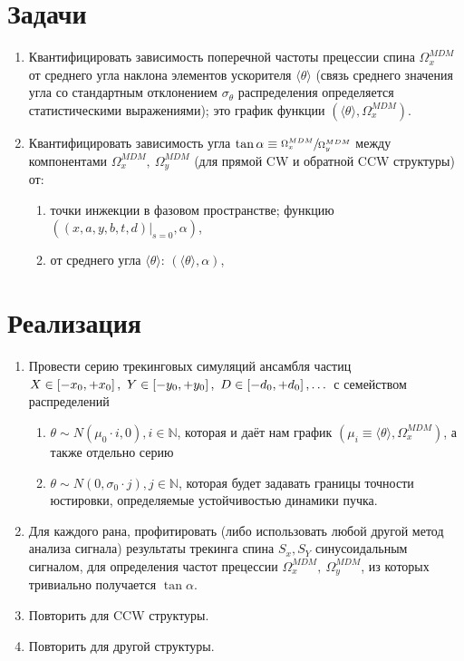 \documentclass{article}
\newcommand{\N}{\mathbb{N}}
\newcommand{\Wmdm}[1]{\Omega_{#1}^{MDM}}
\newcommand{\avg}[1]{\langle #1 \rangle}
\begin{document}
\section{Задачи}
\begin{enumerate}
\item Квантифицировать зависимость поперечной частоты прецессии спина $\Wmdm{x}$ от среднего угла наклона элементов ускорителя $\avg{\theta}$ (связь среднего значения угла со стандартным отклонением $\sigma_\theta$ распределения определяется статистическими выражениями); это график функции $(\avg{\theta}, \Wmdm{x})$.
\item Квантифицировать зависимость угла $\tan\alpha \equiv \sfrac{\Wmdm{x}}{\Wmdm{y}}$ между компонентами $\Wmdm{x},~\Wmdm{y}$ (для прямой CW и обратной CCW структуры) от:
  \begin{enumerate}
  \item точки инжекции в фазовом пространстве; функцию $((x,a,y,b,t,d)\vert_{s=0}, \alpha)$,
  \item от среднего угла $\avg{\theta}$: $(\avg{\theta}, \alpha)$,
  \end{enumerate}
\end{enumerate}

\section{Реализация}
\begin{enumerate}
\item Провести серию трекинговых симуляций ансамбля частиц $X\in \bkt*{-x_0, +x_0}, ~Y\in\bkt*{-y_0, +y_0}, ~D\in\bkt*{-d_0, +d_0}, \dots$ с семейством распределений
  \begin{enumerate}
  \item $\theta \sim N(\mu_0\cdot i, 0), i\in \N$, которая и даёт нам график $(\mu_i\equiv\avg{\theta}, \Wmdm{x})$, а также отдельно серию
  \item $\theta \sim N(0, \sigma_0\cdot j), j \in \N$, которая будет задавать границы точности юстировки, определяемые устойчивостью динамики пучка.
    \end{enumerate}
\item Для каждого рана, профитировать (либо использовать любой другой метод анализа сигнала) результаты трекинга спина $S_x, S_Y$ синусоидальным сигналом, для определения частот прецессии $\Wmdm{x}, ~\Wmdm{y}$, из которых тривиально получается $\tan\alpha$.
\item Повторить для CCW структуры.
  \item Повторить для другой структуры.
\end{enumerate}
\end{document}
